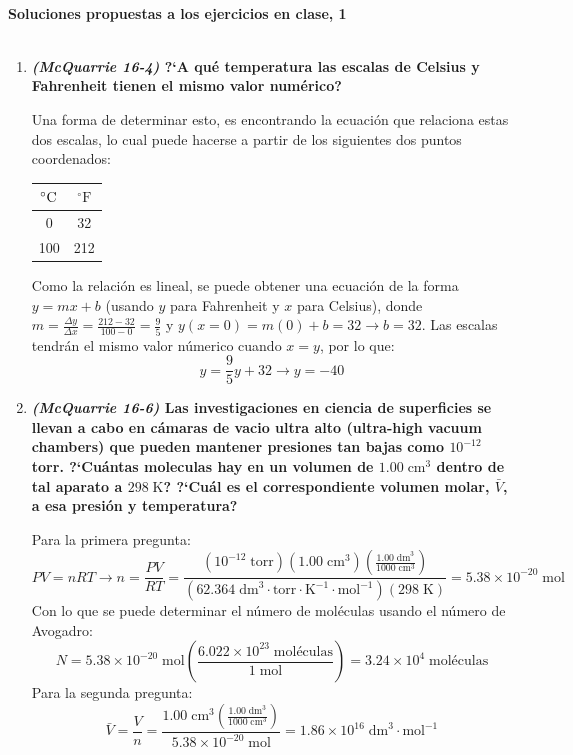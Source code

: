 \documentclass[a4paper,12pt]{article}
\begin{document}

\begin{center}
\HRule \\[0.4cm]
{ \bfseries Soluciones propuestas a los ejercicios en clase, 1}\\ %
\HRule \\[0.4cm]
\end{center}


\begin{enumerate}

 \item \textbf{\textit{(McQuarrie 16-4)} ?`A qu\'e temperatura las escalas de Celsius y Fahrenheit tienen el mismo valor num\'erico?} %

Una forma de determinar esto, es encontrando la ecuaci\'on que relaciona estas dos escalas, lo cual puede hacerse a partir de los siguientes dos puntos coordenados:
\begin{center}
\begin{tabular}{c|c}
$\celsius$ & $^{\circ}\mathrm{F}$ \\\hline
0 & 32 \\
100 & 212
\end{tabular}
\end{center}

Como la relaci\'on es lineal, se puede obtener una ecuaci\'on de la forma $y=mx+b$ (usando $y$ para Fahrenheit y $x$ para Celsius), donde $m=\frac{\Delta y}{\Delta x}=\frac{212-32}{100-0}=\frac{9}{5}$ y $y(x=0)=m(0)+b=32\rightarrow b=32$. Las escalas tendr\'an el mismo valor n\'umerico cuando $x=y$, por lo que:
$$y=\frac{9}{5}y+32\rightarrow y=-40$$

 \item \textbf{\textit{(McQuarrie 16-6)} Las investigaciones en ciencia de superficies se llevan a cabo en c\'amaras de vacio ultra alto (ultra-high vacuum chambers) que pueden mantener presiones tan bajas como $10^{-12}$ torr. ?`Cu\'antas moleculas hay en un volumen de $1.00\;\mbox{cm}^{3}$ dentro de tal aparato a $298\;\mbox{K}$? ?`Cu\'al es el correspondiente volumen molar, $\bar{V}$, a esa presi\'on y temperatura?} %

Para la primera pregunta:
$$PV=nRT\rightarrow n=\frac{PV}{RT}=\frac{(10^{-12}\;\mbox{torr})(1.00\;\mbox{cm}^{3})\left(\frac{1.00\;\mbox{dm}^{3}}{1000\;\mbox{cm}^{3}}\right)}{(62.364\;\mbox{dm}^3\cdot\mbox{torr}\cdot\mbox{K}^{-1}\cdot\mbox{mol}^{-1})(298\;\mbox{K})}=5.38\times 10^{-20}\;\mbox{mol}$$
Con lo que se puede determinar el n\'umero de mol\'eculas usando el n\'umero de Avogadro:
$$N=5.38\times 10^{-20}\;\mbox{mol}\left(\frac{6.022\times 10^{23}\;\mbox{mol\'eculas}}{1\;\mbox{mol}}\right)=3.24\times 10^{4}\;\mbox{mol\'eculas}$$
Para la segunda pregunta:
$$\bar{V}=\frac{V}{n}=\frac{1.00\;\mbox{cm}^{3}\left(\frac{1.00\;\mbox{dm}^{3}}{1000\;\mbox{cm}^{3}}\right)}{5.38\times 10^{-20}\;\mbox{mol}}=1.86\times 10^{16}\;\mbox{dm}^{3}\cdot\mbox{mol}^{-1}$$


\end{enumerate}
\end{document}
